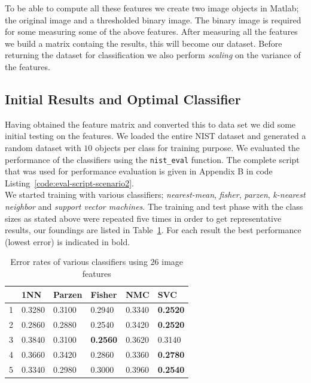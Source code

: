 \documentclass{article}
\begin{document}
To be able to compute all these features we create two image objects in Matlab; the original image and a thresholded binary image. The binary image is required for some measuring some of the above features. After measuring all the features we build a matrix containg the results, this will become our dataset. Before returning the dataset for classification we also perform \emph{scaling} on the variance of the features.

\subsection{Initial Results and Optimal Classifier}

Having obtained the feature matrix and converted this to data set we did some initial testing on the features. We loaded the entire NIST dataset and generated a random dataset with $10$ objects per class for training purpose. We evaluated the performance of the classifiers using the \texttt{nist\_eval} function. The complete script that was used for performance evaluation is given in Appendix B in code Listing~\ref{code:eval-script-scenario2}. \\

We started training with various classifiers; \emph{nearest-mean}, \emph{fisher}, \emph{parzen}, \emph{k-nearest neighbor} and \emph{support vector machines}. The training and test phase with the class sizes as stated above were repeated five times in order to get representative results, our foundings are listed in Table~\ref{table:results-only-features}. For each result the best performance (lowest error) is indicated in bold. 

\begin{table}[H]
	\centering
    \begin{tabular}{|l|lllll|}
    \hline
	& \textbf{1NN} & \textbf{Parzen} & \textbf{Fisher} & \textbf{NMC} & \textbf{SVC} \\
	\hline
	1 & 0.3280 &  0.3100 &   0.2940 &   0.3340 &   \textbf{0.2520} \\
	2 & 0.2860 &  0.2880 &   0.2540 &   0.3420 &   \textbf{0.2520} \\		
	3 & 0.3840 &  0.3100 &   \textbf{0.2560} &   0.3620 &   0.3140 \\	
	4 & 0.3660 &  0.3420 &   0.2860 &   0.3360 &   \textbf{0.2780} \\
	5 & 0.3340 &  0.2980 &   0.3000 &   0.3960 &   \textbf{0.2540} \\
	\hline
    \end{tabular}
    \caption{Error rates of various classifiers using $26$ image features \label{table:results-only-features}}
\end{table}
\end{document}

